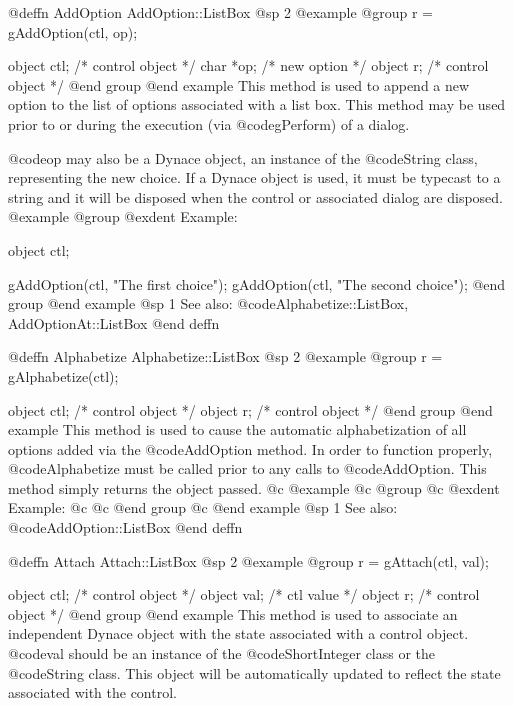 @deffn {AddOption} AddOption::ListBox
@sp 2
@example
@group
r = gAddOption(ctl, op);

object  ctl;    /*  control object  */
char    *op;    /*  new option      */
object  r;      /*  control object  */
@end group
@end example
This method is used to append a new option to the list of options associated
with a list box.  This method may be used prior to or during the execution
(via @code{gPerform}) of a dialog.

@code{op} may also be a Dynace object, an instance of the @code{String}
class, representing the new choice.  If a Dynace object is used, it must
be typecast to a string and it will be disposed when the control or
associated dialog are disposed.
@example
@group
@exdent Example:

object  ctl;

gAddOption(ctl, "The first choice");
gAddOption(ctl, "The second choice");
@end group
@end example
@sp 1
See also:  @code{Alphabetize::ListBox, AddOptionAt::ListBox}
@end deffn















@deffn {Alphabetize} Alphabetize::ListBox
@sp 2
@example
@group
r = gAlphabetize(ctl);

object  ctl;    /*  control object  */
object  r;      /*  control object  */
@end group
@end example
This method is used to cause the automatic alphabetization of all
options added via the @code{AddOption} method.  In order to function
properly, @code{Alphabetize} must be called prior to any calls to
@code{AddOption}.  This method simply returns the object passed.
@c @example
@c @group
@c @exdent Example:
@c 
@c @end group
@c @end example
@sp 1
See also:  @code{AddOption::ListBox}
@end deffn















@deffn {Attach} Attach::ListBox
@sp 2
@example
@group
r = gAttach(ctl, val);

object  ctl;   /*  control object  */
object  val;   /*  ctl value       */
object  r;     /*  control object  */
@end group
@end example
This method is used to associate an independent Dynace object with the
state associated with a control object.  @code{val} should be an
instance of the @code{ShortInteger} class or the @code{String} class.
This object will be automatically updated to reflect the state
associated with the control.

